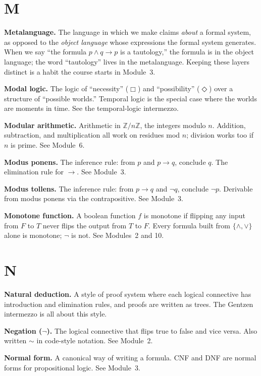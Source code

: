 \documentclass[11pt]{article}
\begin{document}
\section*{M}

\textbf{Metalanguage.} The language in which we make claims \emph{about} a formal system, as opposed to the \emph{object language} whose expressions the formal system generates. When we say ``the formula $p \wedge q \to p$ is a tautology,'' the formula is in the object language; the word ``tautology'' lives in the metalanguage. Keeping these layers distinct is a habit the course starts in Module~3.

\textbf{Modal logic.} The logic of ``necessity'' ($\Box$) and ``possibility'' ($\Diamond$) over a structure of ``possible worlds.'' Temporal logic is the special case where the worlds are moments in time. See the temporal-logic intermezzo.

\textbf{Modular arithmetic.} Arithmetic in $\mathbb{Z}/n\mathbb{Z}$, the integers modulo $n$. Addition, subtraction, and multiplication all work on residues mod $n$; division works too if $n$ is prime. See Module~6.

\textbf{Modus ponens.} The inference rule: from $p$ and $p \to q$, conclude $q$. The elimination rule for $\to$. See Module~3.

\textbf{Modus tollens.} The inference rule: from $p \to q$ and $\lnot q$, conclude $\lnot p$. Derivable from modus ponens via the contrapositive. See Module~3.

\textbf{Monotone function.} A boolean function $f$ is monotone if flipping any input from $F$ to $T$ never flips the output from $T$ to $F$. Every formula built from $\{\wedge, \vee\}$ alone is monotone; $\lnot$ is not. See Modules~2 and 10.

\section*{N}

\textbf{Natural deduction.} A style of proof system where each logical connective has introduction and elimination rules, and proofs are written as trees. The Gentzen intermezzo is all about this style.

\textbf{Negation ($\lnot$).} The logical connective that flips true to false and vice versa. Also written $\sim$ in code-style notation. See Module~2.

\textbf{Normal form.} A canonical way of writing a formula. CNF and DNF are normal forms for propositional logic. See Module~3.
\end{document}
